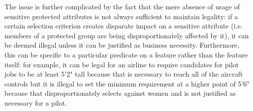 The issue is further complicated by the fact that the mere absence of usage of
sensitive protected attributes is not always sufficient to maintain legality:
if a certain selection criterion creates disparate impact on a sensitive
attribute (i.e. members of a protected group are being disproportionately
affected by it), it can be deemed illegal unless it can be justified as business
necessity. Furthermore, this can be specific to a particular predicate on a
feature rather than the feature itself: for example, it can be legal for an
airline to require candidates for pilot jobs to be at least 5'2" tall because
that is necessary to reach all of the aircraft controls but it is illegal to
set the minimum requirement at a higher point of 5'6" because that
disproportionately selects against women and is not justified as necessary
for a pilot\cite{RoseMaryCourtCase}.
